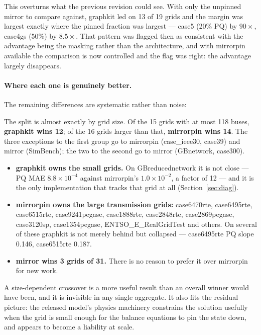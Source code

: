 \documentclass[10pt]{article}
\begin{document}
This overturns what the previous revision could see. With only the unpinned
mirror to compare against, graphkit led on 13 of 19 grids and the margin was
largest exactly where the pinned fraction was largest --- case5 (20\% PQ) by
$90\times$, case4gs (50\%) by $8.5\times$. That pattern was flagged then as
consistent with the advantage being the masking rather than the architecture,
and with mirrorpin available the comparison is now controlled and the flag was
right: the advantage largely disappears.

\paragraph{Where each one is genuinely better.} The remaining differences are
systematic rather than noise:

The split is almost exactly by grid size. Of the 15 grids with at most 118
buses, \textbf{graphkit wins 12}; of the 16 grids larger than that,
\textbf{mirrorpin wins 14}. The three exceptions to the first group go to
mirrorpin (case\_ieee30, case39) and mirror (SimBench); the two to the second go
to mirror (GBnetwork, case300).

\begin{itemize}
\item \textbf{graphkit owns the small grids.} On GBreducednetwork it is not
close --- PQ MAE $8.8\times10^{-4}$ against mirrorpin's $1.0\times10^{-2}$, a
factor of 12 --- and it is the only implementation that tracks that grid at all
(Section~\ref{sec:diag}).
\item \textbf{mirrorpin owns the large transmission grids:} case6470rte,
case6495rte, case6515rte, case9241pegase, case1888rte, case2848rte,
case2869pegase, case3120sp, case1354pegase, ENTSO\_E\_RealGridTest and others.
On several of these graphkit is not merely behind but collapsed --- case6495rte
PQ slope 0.146, case6515rte 0.187.
\item \textbf{mirror wins 3 grids of 31.} There is no reason to prefer it over
mirrorpin for new work.
\end{itemize}

A size-dependent crossover is a more useful result than an overall winner would
have been, and it is invisible in any single aggregate. It also fits the
residual picture: the released model's physics machinery constrains the solution
usefully when the grid is small enough for the balance equations to pin the
state down, and appears to become a liability at scale.
\end{document}
